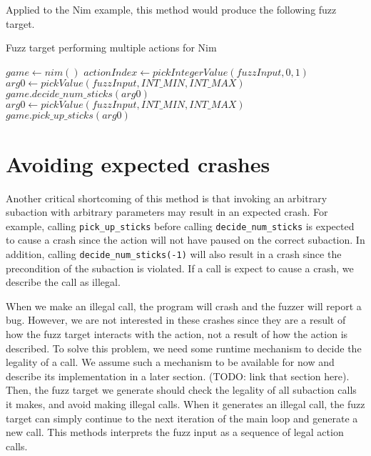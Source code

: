 Applied to the Nim example, this method would produce the following fuzz target.
\begin{algorithm}[H]
    \caption{Fuzz target performing multiple actions for Nim}
    \begin{algorithmic}[1]
    \STATE $game \gets nim()$
        \STATE $actionIndex \gets pickIntegerValue(fuzzInput, 0, 1)$
            \STATE $arg0 \gets pickValue(fuzzInput, INT\_MIN, INT\_MAX)$
            \STATE $game.decide\_num\_sticks(arg0)$
        \ENDIF
            \STATE $arg0 \gets pickValue(fuzzInput, INT\_MIN, INT\_MAX)$
            \STATE $game.pick\_up\_sticks(arg0)$
        \ENDIF
    \ENDWHILE
    \end{algorithmic}
\end{algorithm}

\section{Avoiding expected crashes}
Another critical shortcoming of this method is that invoking an arbitrary subaction with arbitrary parameters may result in an expected crash.
For example, calling \texttt{pick\_up\_sticks} before calling \texttt{decide\_num\_sticks} is expected to cause a crash since the action will not have paused on the correct subaction.
In addition, calling \texttt{decide\_num\_sticks(-1)} will also result in a crash since the precondition of the subaction is violated.
If a call is expect to cause a crash, we describe the call as illegal.

When we make an illegal call, the program will crash and the fuzzer will report a bug.
However, we are not interested in these crashes since they are a result of how the fuzz target interacts with the action, not a result of how the action is described.
To solve this problem, we need some runtime mechanism to decide the legality of a call.
We assume such a mechanism to be available for now and describe its implementation in a later section. (TODO: link that section here).
Then, the fuzz target we generate should check the legality of all subaction calls it makes, and avoid making illegal calls.
When it generates an illegal call, the fuzz target can simply continue to the next iteration of the main loop and generate a new call.
This methods interprets the fuzz input as a sequence of legal action calls.

